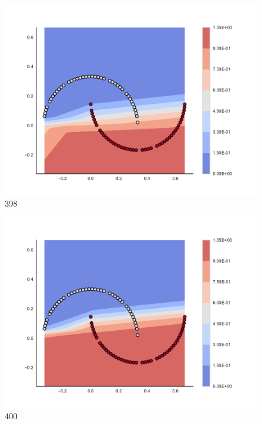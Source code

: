 \begin{subfigure}[b]{0.09\textwidth}
    \includegraphics[clip, trim=2.35cm 1.75cm 4.5cm 0cm,width=\textwidth]{img/convergence/398.pdf}
    \caption{398}
    \label{fig:convergence_398}
\end{subfigure}
%
\begin{subfigure}[b]{0.09\textwidth}
    \includegraphics[clip, trim=2.35cm 1.75cm 4.5cm 0cm,width=\textwidth]{img/convergence/400.pdf}
    \caption{400}
    \label{fig:convergence_400}
\end{subfigure}
%
